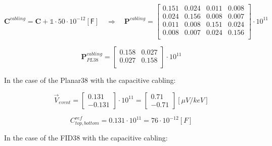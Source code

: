 \begin{equation}
\bm{C}^{cabling} = \bm{C} + \mathbb{1} \cdot 50 \cdot 10^{-12} [\textsf{F}]
\quad \Rightarrow \quad
\bm{P}^{cabling} = 
\begin{bmatrix}
  0.151 & 0.024 & 0.011 & 0.008\\
  0.024 & 0.156 & 0.008 & 0.007\\
  0.011 & 0.008 & 0.151 & 0.024\\
  0.008 & 0.007 & 0.024 & 0.156\\
\end{bmatrix}
\cdot 10^{11}
\end{equation}

\begin{equation}
\bm{P}_{PL38}^{cabling}
=
\begin{bmatrix}
  0.158 & 0.027 \\
  0.027 & 0.158 \\
\end{bmatrix}
\cdot
10^{11}
\end{equation}

In the case of the Planar38 with the capacitive cabling:

\begin{equation}
\vec{V}_{event}
=
\begin{bmatrix}
0.131 \\
-0.131
\end{bmatrix}
\cdot 10^{11}
=
\begin{bmatrix}
0.71 \\
-0.71
\end{bmatrix}
[\mu V/keV]
\end{equation}

\begin{equation}
C_{top, bottom}^{ref}
= 0.131 \cdot 10^{11}
= 76 \cdot 10^{-12} [F]
\end{equation}

In the case of the FID38 with the capacitive cabling:

